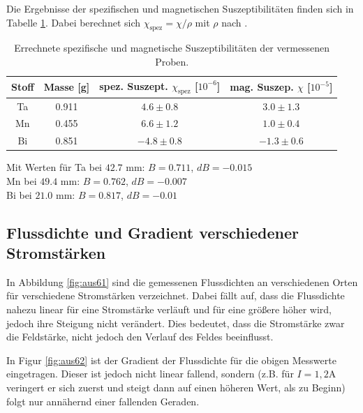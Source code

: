 \documentclass[12pt,a4paper,titlepage,headinclude,bibtotoc]{scrartcl}
\begin{document}
Die Ergebnisse der spezifischen und magnetischen Suszeptibilitäten finden sich in Tabelle \ref{tab:suszep}.
Dabei berechnet sich $\chi_\text{spez}=\chi/\rho$ mit $\rho$ nach \cite{formelsammlung}.

\begin{table}
	\centering
	\begin{tabular}{|c|c|c|c|}
		\hline
		Stoff 	& Masse [g]	& spez. Suszept. $\chi_\text{spez}$ [$10^{-6}$]	& mag. Suszep. $\chi$ [$10^{-5}$] \\\hline\hline
		Ta	& 0.911		& $4.6\pm 0.8$ 			& $3.0 \pm 1.3$ \\\hline
		Mn	& 0.455		& $6.6 \pm 1.2$			& $1.0 \pm 0.4$ \\\hline
		Bi	& 0.851		& $-4.8 \pm 0.8 $		& $-1.3 \pm 0.6$\\\hline
	\end{tabular}
	\caption{Errechnete spezifische und magnetische Suszeptibilitäten der vermessenen Proben.}
	\label{tab:suszep}
\end{table}

Mit Werten für Ta bei $42.7$ mm: $B= 0.711$, $dB= -0.015$\\
Mn bei $49.4$ mm: $B= 0.762$, $dB= -0.007$\\
Bi bei $21.0$ mm: $B= 0.817$, $dB= -0.01$

\subsection{Flussdichte und Gradient verschiedener Stromstärken}
In Abbildung \ref{fig:aus61} sind die gemessenen Flussdichten an verschiedenen Orten für verschiedene Stromstärken verzeichnet.
Dabei fällt auf, dass die Flussdichte nahezu linear für eine Stromstärke verläuft und für eine größere höher wird, jedoch ihre Steigung nicht verändert.
Dies bedeutet, dass die Stromstärke zwar die Feldstärke, nicht jedoch den Verlauf des Feldes beeinflusst.

In Figur \ref{fig:aus62} ist der Gradient der Flussdichte für die obigen Messwerte eingetragen.
Dieser ist jedoch nicht linear fallend, sondern (z.B. für $I=1,2\si\ampere$ veringert er sich zuerst und steigt dann auf einen höheren Wert, als zu Beginn) folgt nur annähernd einer fallenden Geraden.
\end{document}
